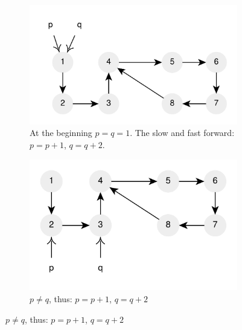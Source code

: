 



\begin{figure}
	\vspace*{-0.5in}
	\centering
	\begin{subfigure}[t]{0.36\textwidth}
		\includegraphics[width=1\linewidth]{sources/cycle_in_list/images/floyd1}
		\caption{At the beginning $p=q=1$. The slow and fast forward: $p=p+1$, $q=q+2$.}
		\label{fig:cycle_in_list:floyd1}
	 \end{subfigure}
	\hfill
	\begin{subfigure}[t]{0.36\textwidth}
		\includegraphics[width=1\linewidth]{sources/cycle_in_list/images/floyd2}
		\caption{$p \neq q$,  thus: $p=p+1$, $q=q+2$}

\end{subfigure}
\end{figure}
